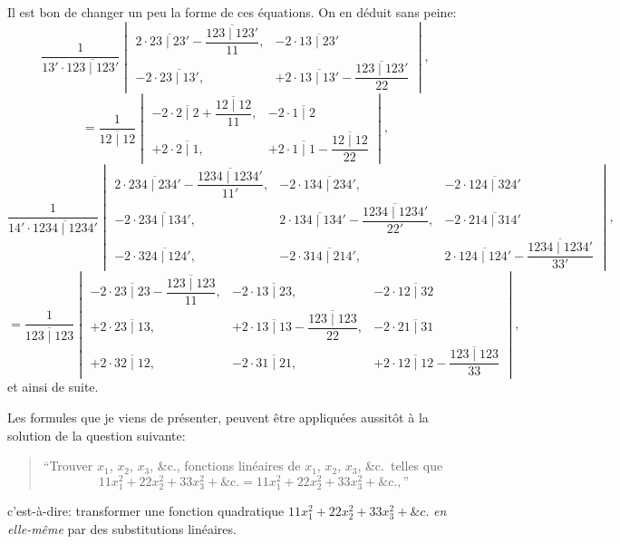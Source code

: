 \documentclass[12pt,a4paper]{article}
\begin{document}
Il est bon de changer un peu la forme de ces \'{e}quations. On en d\'{e}duit sans peine:
\[
\frac{1}{13' \cdot \overline{123 \mid 123'}}
\begin{vmatrix}
2 \cdot \overline{23 \mid 23'} - \dfrac{\overline{123 \mid 123'}}{11}, &
-2 \cdot \overline{13 \mid 23'} \\[1em]
-2 \cdot \overline{23 \mid 13'}, &
+2 \cdot \overline{13 \mid 13'} - \dfrac{\overline{123 \mid 123'}}{22}
\end{vmatrix},
\]
\[
= \frac{1}{\overline{12 \mid 12}}
\begin{vmatrix}
-2 \cdot \overline{2 \mid 2} + \dfrac{\overline{12 \mid 12}}{11}, &
-2 \cdot \overline{1 \mid 2} \\[1em]
+2 \cdot \overline{2 \mid 1}, &
+2 \cdot \overline{1 \mid 1} - \dfrac{\overline{12 \mid 12}}{22}
\end{vmatrix},
\]
\[
\frac{1}{14' \cdot \overline{1234 \mid 1234'}}
\begin{vmatrix}
2 \cdot \overline{234 \mid 234'} - \dfrac{\overline{1234 \mid 1234'}}{11'}, &
-2 \cdot \overline{134 \mid 234'}, &
-2 \cdot \overline{124 \mid 324'} \\[1em]
-2 \cdot \overline{234 \mid 134'}, &
2 \cdot \overline{134 \mid 134'} - \dfrac{\overline{1234 \mid 1234'}}{22'}, &
-2 \cdot \overline{214 \mid 314'} \\[1em]
-2 \cdot \overline{324 \mid 124'}, &
-2 \cdot \overline{314 \mid 214'}, &
2 \cdot \overline{124 \mid 124'} - \dfrac{\overline{1234 \mid 1234'}}{33'}
\end{vmatrix},
\]
\[
= \frac{1}{\overline{123 \mid 123}}
\begin{vmatrix}
-2 \cdot \overline{23 \mid 23} - \dfrac{\overline{123 \mid 123}}{11}, &
-2 \cdot \overline{13 \mid 23}, &
-2 \cdot \overline{12 \mid 32} \\[1em]
+2 \cdot \overline{23 \mid 13}, &
+2 \cdot \overline{13 \mid 13} - \dfrac{\overline{123 \mid 123}}{22}, &
-2 \cdot \overline{21 \mid 31} \\[1em]
+2 \cdot \overline{32 \mid 12}, &
-2 \cdot \overline{31 \mid 21}, &
+2 \cdot \overline{12 \mid 12} - \dfrac{\overline{123 \mid 123}}{33}
\end{vmatrix},
\]
et ainsi de suite.

Les formules que je viens de pr\'{e}senter, peuvent \^{e}tre appliqu\'{e}es aussit\^{o}t \`{a} la solution de la question suivante:

\begin{quote}
``Trouver $x_1$, $x_2$, $x_3$, \&c., fonctions lin\'{e}aires de $x_1$, $x_2$, $x_3$, \&c.\ telles que
\[
11 x_1^2 + 22 x_2^2 + 33 x_3^2 + \text{\&c.} = 11 x_1^2 + 22 x_2^2 + 33 x_3^2 + \text{\&c.},\text{''}
\]
\end{quote}
c'est-\`{a}-dire: transformer une fonction quadratique $11x_1^2 + 22x_2^2 + 33x_3^2 + \&c.$ \textit{en elle-m\^{e}me} par des substitutions lin\'{e}aires.
\end{document}
